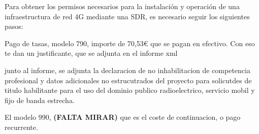 Para obtener los permisos necesarios para la instalación y operación de una infraestructura de red 4G mediante una SDR, es necesario seguir los siguientes pasos:

Pago de tasas, modelo 790, importe de 70,53€ que se pagan en efectivo.
Con eso te dan un justificante, que se adjunta en el informe xml

junto al informe, se adjunta la declaracion de no inhabilitacion de competencia profesional y datos adicionales no estrucutrados del proyecto para solicutdes de titulo habilitante para el uso del dominio publico radioelectrico, servicio mobil y fijo de banda estrecha.

El modelo 990, \textbf{(FALTA MIRAR)} que es el coste de continuacion, o pago recurrente.